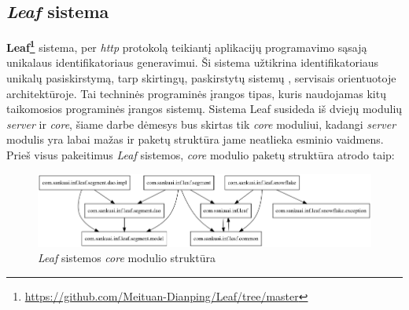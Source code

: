 \subsection{\textit{Leaf} sistema}
\textbf{Leaf\footnote{\url{https://github.com/Meituan-Dianping/Leaf/tree/master}}} sistema, per \textit{http}
protokolą teikiantį aplikacijų programavimo sąsają unikalaus identifikatoriaus generavimui.
Ši sistema užtikrina identifikatoriaus unikalų pasiskirstymą, tarp skirtingų, paskirstytų sistemų ,
servisais orientuotoje  architektūroje.
Tai techninės programinės įrangos tipas, kuris naudojamas kitų taikomosios programinės įrangos sistemų.
Sistema Leaf susideda iš dviejų modulių \textit{server} ir \textit{core}, šiame darbe dėmesys bus skirtas tik \textit{core} moduliui,
kadangi \textit{server} modulis yra labai mažas
ir paketų struktūra jame neatlieka esminio vaidmens.
Prieš visus pakeitimus \textit{Leaf} sistemos, \textit{core} modulio paketų struktūra atrodo taip:
\begin{figure}[H]
    \centering
    \includegraphics[scale=0.5]{img/leaf_packages_orig}
    \caption{\textit{Leaf} sistemos \textit{core} modulio struktūra}
    \label{img:leaf_packages_orig}
\end{figure}


